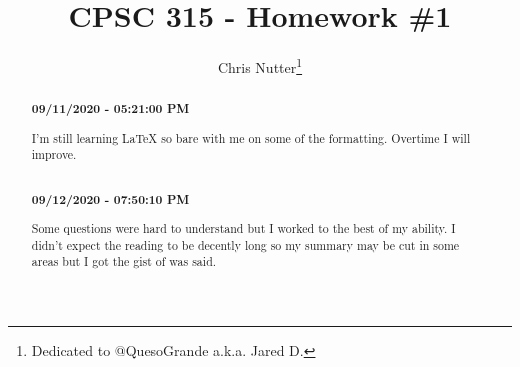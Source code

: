 \documentclass[12pt,a4paper]{article}
\title{CPSC 315 - Homework \#1}
\author{Chris Nutter\thanks{Dedicated to @QuesoGrande a.k.a. Jared D.}}
\begin{document}
\maketitle

\begin{abstract}
    \noindent
    \begin{center}\textbf{09/11/2020 - 05:21:00 PM}\end{center}
    I'm still learning LaTeX so bare with me on some of the formatting. Overtime I will improve.\\\\
    \begin{center}\textbf{09/12/2020 - 07:50:10 PM}\end{center}
    Some questions were hard to understand but I worked to the best of my ability. I didn't expect the reading to be decently long so my summary may be cut in some areas but I got the gist of was said.
\end{abstract}

\tableofcontents    
\newpage

\end{document}
